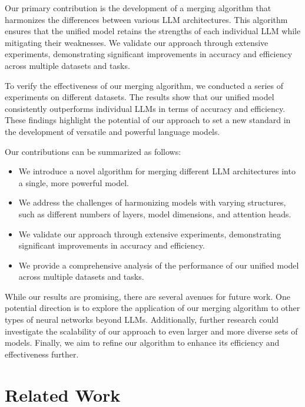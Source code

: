 \documentclass{article} %
\begin{document}
Our primary contribution is the development of a merging algorithm that harmonizes the differences between various LLM architectures. This algorithm ensures that the unified model retains the strengths of each individual LLM while mitigating their weaknesses. We validate our approach through extensive experiments, demonstrating significant improvements in accuracy and efficiency across multiple datasets and tasks.

To verify the effectiveness of our merging algorithm, we conducted a series of experiments on different datasets. The results show that our unified model consistently outperforms individual LLMs in terms of accuracy and efficiency. These findings highlight the potential of our approach to set a new standard in the development of versatile and powerful language models.

Our contributions can be summarized as follows:
\begin{itemize}
    \item We introduce a novel algorithm for merging different LLM architectures into a single, more powerful model.
    \item We address the challenges of harmonizing models with varying structures, such as different numbers of layers, model dimensions, and attention heads.
    \item We validate our approach through extensive experiments, demonstrating significant improvements in accuracy and efficiency.
    \item We provide a comprehensive analysis of the performance of our unified model across multiple datasets and tasks.
\end{itemize}

While our results are promising, there are several avenues for future work. One potential direction is to explore the application of our merging algorithm to other types of neural networks beyond LLMs. Additionally, further research could investigate the scalability of our approach to even larger and more diverse sets of models. Finally, we aim to refine our algorithm to enhance its efficiency and effectiveness further.

\section{Related Work}
\label{sec:related}
\end{document}
